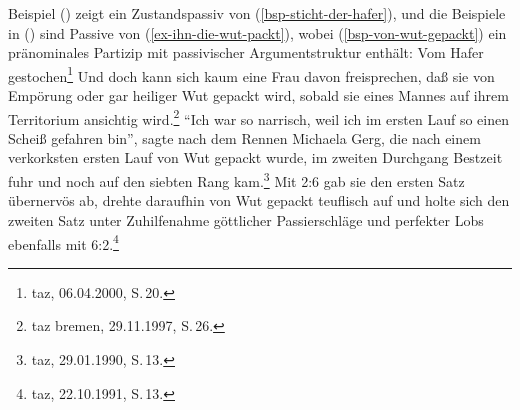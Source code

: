\noindent
Beispiel () zeigt ein Zustandspassiv von (\ref{bsp-sticht-der-hafer}), und die Beispiele in
() sind Passive von (\ref{ex-ihn-die-wut-packt}), wobei (\ref{bsp-von-wut-gepackt}) ein
pränominales Partizip mit passivischer Argumentstruktur enthält: 
\ea
Vom Hafer gestochen\footnote{
  taz, 06.04.2000, S.\,20.
}
\z
\eal
\label{wut-gepackt}
\ex Und doch kann sich kaum eine Frau davon freisprechen, daß sie von Empörung oder gar heiliger Wut gepackt wird, sobald sie eines Mannes auf ihrem Territorium ansichtig wird.\footnote{
  taz bremen, 29.11.1997, S.\,26.
}
\ex "`Ich war so narrisch, weil ich im ersten Lauf so einen Scheiß gefahren bin"', 
    sagte nach dem Rennen Michaela Gerg, die nach einem verkorksten ersten Lauf von Wut gepackt wurde, 
    im zweiten Durchgang Bestzeit fuhr und noch auf den siebten Rang kam.\footnote{
      taz, 29.01.1990, S.\,13.
    }
\ex\label{bsp-von-wut-gepackt}
Mit 2:6 gab sie den ersten Satz übernervös ab, drehte daraufhin von Wut gepackt teuflisch auf und holte sich den zweiten Satz unter Zuhilfenahme göttlicher Passierschläge und perfekter Lobs ebenfalls mit 6:2.\footnote{
  taz, 22.10.1991, S.\,13.
}
\zl

